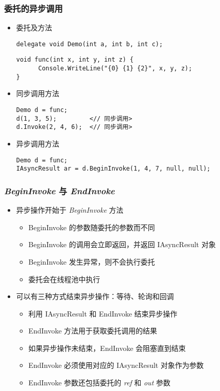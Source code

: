 \begin{frame}[fragile]
\frametitle{委托的异步调用}

\begin{itemize}
\item 委托及方法
\begin{lstlisting}
delegate void Demo(int a, int b, int c);
\end{lstlisting}
\begin{lstlisting}
void func(int x, int y, int z) {
      Console.WriteLine("{0} {1} {2}", x, y, z);
}
\end{lstlisting}
\item 同步调用方法
\begin{lstlisting}[escapeinside=<>]
Demo d = func;
d(1, 3, 5);         <// 同步调用>
d.Invoke(2, 4, 6);  <// 同步调用>
\end{lstlisting}
\item 异步调用方法
\begin{lstlisting}[escapeinside=<>]
Demo d = func;
IAsyncResult ar = d.BeginInvoke(1, 4, 7, null, null);
\end{lstlisting}
\end{itemize}
\end{frame}


\begin{frame}[fragile]
\frametitle{\emph{BeginInvoke} 与 \emph{EndInvoke}}
\begin{itemize}
\item 异步操作开始于 \textit{BeginInvoke} 方法
\begin{itemize}
\setlength{\itemsep}{4pt plus 1pt}
\item BeginInvoke 的参数随委托的参数而不同
\item BeginInvoke 的调用会立即返回，并返回 IAsyncResult 对象
\item BeginInvoke 发生异常，则不会执行委托
\item 委托会在线程池中执行
\end{itemize}
\item 可以有三种方式结束异步操作：等待、轮询和回调
\begin{itemize}
\setlength{\itemsep}{4pt plus 1pt}
\item 利用 IAsyncResult 和 EndInvoke 结束异步操作
\item EndInvoke 方法用于获取委托调用的结果
\item 如果异步操作未结束，EndInvoke 会阻塞直到结束
\item EndInvoke 必须使用对应的 IAsyncResult 对象作为参数
\item EndInvoke 参数还包括委托的 \textit{ref} 和 \textit{out} 参数
\end{itemize}
\end{itemize}

\end{frame}

